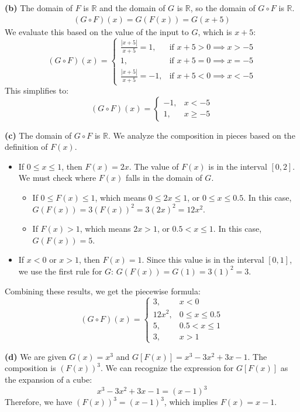 \textbf{(b)}
The domain of \(F\) is \(\mathbb{R}\) and the domain of \(G\) is \(\mathbb{R}\), so the domain of \(G \circ F\) is \(\mathbb{R}\).
\begin{align*}
(G \circ F)(x) = G(F(x)) = G(x+5)
\end{align*}
We evaluate this based on the value of the input to \(G\), which is \(x+5\):
\[ (G \circ F)(x) = 
\begin{cases} 
\frac{|x+5|}{x+5} = 1, & \text{if } x+5 > 0 \implies x > -5 \\
1, & \text{if } x+5 = 0 \implies x = -5 \\
\frac{|x+5|}{x+5} = -1, & \text{if } x+5 < 0 \implies x < -5 
\end{cases}
\]
This simplifies to:
\[ (G \circ F)(x) = \begin{cases} -1, & x < -5 \\ 1, & x \ge -5 \end{cases} \]

\textbf{(c)}
The domain of \(G \circ F\) is \(\mathbb{R}\). We analyze the composition in pieces based on the definition of \(F(x)\).
\begin{itemize}
\item If $0 \le x \le 1$, then $F(x) = 2x$. The value of $F(x)$ is in the interval $[0, 2]$. We must check where $F(x)$ falls in the domain of $G$.
\begin{itemize}
\item If $0 \le F(x) \le 1$, which means $0 \le 2x \le 1$, or $0 \le x \le 0.5$. In this case, $G(F(x)) = 3(F(x))^2 = 3(2x)^2 = 12x^2$.
\item If $F(x) > 1$, which means $2x > 1$, or $0.5 < x \le 1$. In this case, $G(F(x)) = 5$.
\end{itemize}
\item If $x < 0$ or $x > 1$, then $F(x)=1$. Since this value is in the interval $[0,1]$, we use the first rule for $G$: $G(F(x)) = G(1) = 3(1)^2 = 3$.
\end{itemize}
Combining these results, we get the piecewise formula:
\[ (G \circ F)(x) = \begin{cases} 
3, & x < 0 \\
12x^2, & 0 \le x \le 0.5 \\
5, & 0.5 < x \le 1 \\
3, & x > 1
\end{cases}
\]

\textbf{(d)}
We are given $G(x) = x^3$ and $G[F(x)] = x^3 - 3x^2 + 3x - 1$.
The composition is $(F(x))^3$. We can recognize the expression for $G[F(x)]$ as the expansion of a cube:
\[ x^3 - 3x^2 + 3x - 1 = (x-1)^3 \]
Therefore, we have $(F(x))^3 = (x-1)^3$, which implies $F(x) = x-1$.

